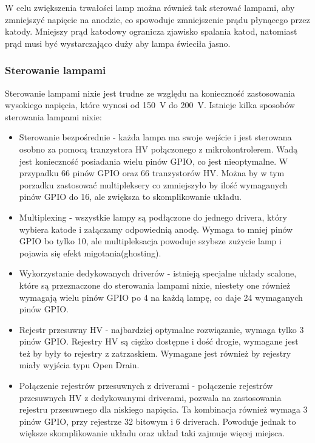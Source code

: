 \documentclass[../main.tex]{subfiles}
\begin{document}
W celu zwiększenia trwałości lamp można również tak sterować lampami, aby zmniejszyć napięcie na anodzie, co spowoduje zmniejszenie prądu płynącego przez katody.
Mniejszy prąd katodowy ogranicza zjawisko spalania katod, natomiast prąd musi być wystarczająco duży aby lampa świeciła jasno.

\newpage

\subsubsection{Sterowanie lampami}
Sterowanie lampami nixie jest trudne ze względu na konieczność zastosowania wysokiego napięcia, które wynosi od \SI{150}{\volt} do \SI{200}{\volt}.
Istnieje kilka sposobów sterowania lampami nixie:

\begin{itemize}
    \item Sterowanie bezpośrednie - każda lampa ma swoje wejście i jest sterowana osobno za pomocą tranzystora HV połączonego z mikrokontrolerem.
    Wadą jest konieczność posiadania wielu pinów GPIO, co jest nieoptymalne. W przypadku 66 pinów GPIO oraz 66 tranzystorów HV.
    Można by w tym porzadku zastosować multipleksery co zmniejszyło by ilość wymaganych pinów GPIO do 16, ale zwiększa to skomplikowanie układu.
    \item Multiplexing - wszystkie lampy są podłączone do jednego drivera, który wybiera katode i załączamy odpowiednią anodę. 
    Wymaga to mniej pinów GPIO bo tylko 10, ale multipleksacja powoduje szybsze zużycie lamp i pojawia się efekt migotania(ghosting).
    \item Wykorzystanie dedykowanych driverów - istnieją specjalne układy scalone, które są przeznaczone do sterowania lampami nixie, niestety
    one również wymagają wielu pinów GPIO po 4 na każdą lampę, co daje 24 wymaganych pinów GPIO.
    \item Rejestr przesuwny HV - najbardziej optymalne rozwiązanie, wymaga tylko 3 pinów GPIO. Rejestry HV są ciężko dostępne i dość drogie,
    wymagane jest też by były to rejestry z zatrzaskiem. Wymagane jest również by rejestry miały wyjścia typu Open Drain.
    \item Połączenie rejestrów przesuwnych z driverami - połączenie rejestrów przesuwnych HV z dedykowanymi driverami, pozwala na zastosowania
    rejestru przesuwnego dla niskiego napięcia. Ta kombinacja również wymaga 3 pinów GPIO, przy rejestrze 32 bitowym i 6 driverach. Powoduje jednak to
    większe skomplikowanie układu oraz układ taki zajmuje więcej miejsca.
\end{itemize}
\end{document}
